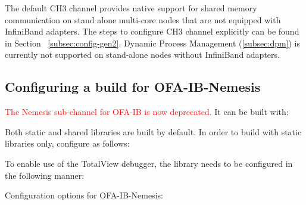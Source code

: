 The default CH3 channel provides native support for shared memory communication
on stand alone multi-core nodes that are not equipped with InfiniBand adapters.
The steps to configure CH3 channel explicitly can be found in Section
~\ref{subsec:config-gen2}.  Dynamic Process Management (\ref{subsec:dpm}) is
currently not supported on stand-alone nodes without InfiniBand adapters.

\subsection{Configuring a build for OFA-IB-Nemesis}
\textcolor{red}{The Nemesis sub-channel for OFA-IB is now deprecated.} It can be built with:


Both static and shared libraries are built by default. In order to build with static libraries only, configure as follows:


To enable use of the TotalView debugger, the library needs to be configured
in the following manner:


Configuration options for OFA-IB-Nemesis:

